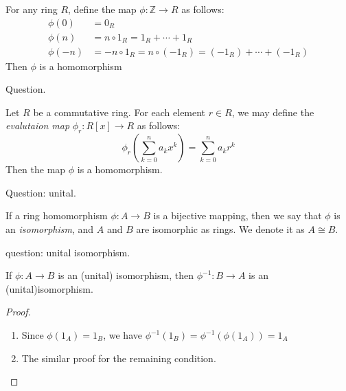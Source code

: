 \begin{example}
For any ring $R$, define the map $\phi:\mathbb{Z}\to R$ as follows:
\begin{align*}
\phi(0)&=0_R\\
\phi(n)&=n\circ1_R=1_R+\cdots+1_R\\
\phi(-n)&=-n\circ 1_R=n\circ(-1_R)=(-1_R)+\cdots+(-1_R)
\end{align*}
Then $\phi$ is a homomorphism
\end{example}
Question.
\begin{example}
Let $R$ be a commutative ring. For each element $r\in R$, we may define the \emph{evalutaion map} $\phi_r:R[x]\to R$ as follows:
\[
\phi_r(\sum_{k=0}^na_kx^k)=\sum_{k=0}^na_kr^k
\]
Then the map $\phi$ is a homomorphism.
\end{example}
Question: unital.

\begin{definition}[Isomorphism]
If a ring homomorphism $\phi: A\to B$ is a bijective mapping, then we say that $\phi$ is an \emph{isomorphism}, and $A$ and $B$ are isomorphic as rings. We denote it as $A\cong B$.
\end{definition}
question: unital isomorphism.
\begin{proposition}
If $\phi: A\to B$ is an (unital) isomorphism, then $\phi^{-1}:B\to A$ is an (unital)isomorphism.
\end{proposition}
\begin{proof}
\begin{enumerate}
\item
Since $\phi(1_A)=1_B$, we have $\phi^{-1}(1_B)=\phi^{-1}(\phi(1_A))=1_A$
\item
The similar proof for the remaining condition.
\end{enumerate}
\end{proof}

